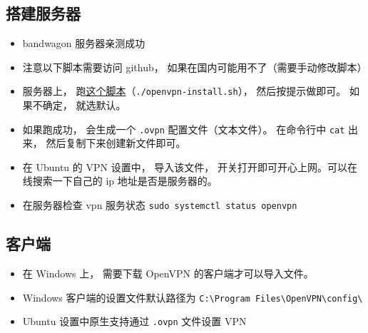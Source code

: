 
\begin{issues}
\issueDraft
\end{issues}

\subsection{搭建服务器}
\begin{itemize}
\item bandwagon 服务器亲测成功
\item 注意以下脚本需要访问 github， 如果在国内可能用不了（需要手动修改脚本）
\item 服务器上， 跑\href{https://github.com/MacroUniverse/openvpn-install/blob/master/openvpn-install.sh}{这个脚本}（\verb`./openvpn-install.sh`）， 然后按提示做即可。 如果不确定， 就选默认。
\item 如果跑成功， 会生成一个 \verb`.ovpn` 配置文件（文本文件）。 在命令行中 \verb`cat` 出来， 然后复制下来创建新文件即可。
\item 在 Ubuntu 的 VPN 设置中， 导入该文件， 开关打开即可开心上网。可以在线搜索一下自己的 ip 地址是否是服务器的。
\item 在服务器检查 vpn 服务状态 \verb`sudo systemctl status openvpn`
\end{itemize}

\subsection{客户端}
\begin{itemize}
\item 在 Windows 上， 需要下载 OpenVPN 的客户端才可以导入文件。
\item Windows 客户端的设置文件默认路径为 \verb`C:\Program Files\OpenVPN\config\`
\item Ubuntu 设置中原生支持通过 \verb`.ovpn` 文件设置 VPN
\end{itemize}

